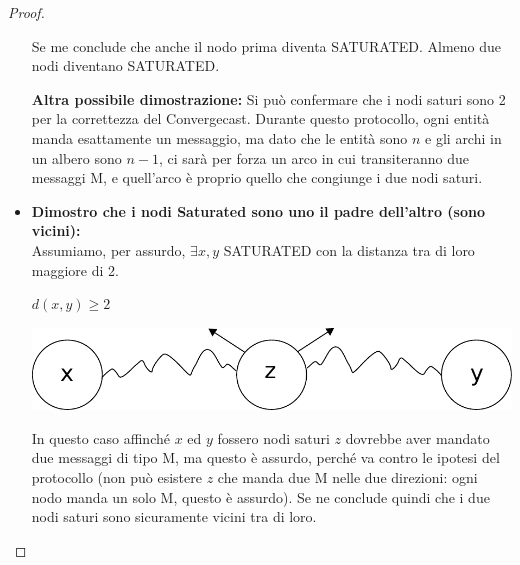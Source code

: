 \begin{proof}
\begin{itemize}
              Se me conclude che anche il nodo prima diventa SATURATED. Almeno due
              nodi diventano SATURATED.

              \textbf{Altra possibile dimostrazione:} Si può confermare che i nodi
              saturi sono 2 per la correttezza del Convergecast. Durante questo
              protocollo, ogni entità manda esattamente un messaggio, ma dato che le
              entità sono $n$ e gli archi in un albero sono $n-1$, ci sarà per forza
              un arco in cui transiteranno due messaggi M, e quell'arco è proprio
              quello che congiunge i due nodi saturi.


        \item \textbf{Dimostro che i nodi Saturated sono uno il padre dell'altro
                  (sono vicini):}\\  Assumiamo, per assurdo, $\exists x,y$ SATURATED con la
              distanza tra di loro maggiore di 2.
              \begin{center}
                  $d(x,y) \geq 2$

                  \includegraphics[scale=0.5]{capitoli/saturazione/imgs/n_41}
              \end{center}

              In questo caso affinché $x$ ed $y$ fossero nodi saturi $z$ dovrebbe
              aver mandato due messaggi di tipo M, ma questo è assurdo, perché va
              contro le ipotesi del protocollo (non può esistere $z$ che manda due M
              nelle due direzioni: ogni nodo manda un solo M, questo è assurdo). Se
              ne conclude quindi che i due nodi saturi sono sicuramente vicini tra
              di loro.

    \end{itemize}
\end{proof}



